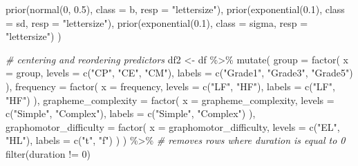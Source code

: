 \documentclass[
  11pt,
  english,
  ,doc,floatsintext]{apa6}
\newenvironment{Shaded}{}{}
\newcommand{\AttributeTok}[1]{\textcolor[rgb]{0.49,0.56,0.16}{#1}}
\newcommand{\CommentTok}[1]{\textcolor[rgb]{0.38,0.63,0.69}{\textit{#1}}}
\newcommand{\DecValTok}[1]{\textcolor[rgb]{0.25,0.63,0.44}{#1}}
\newcommand{\FloatTok}[1]{\textcolor[rgb]{0.25,0.63,0.44}{#1}}
\newcommand{\FunctionTok}[1]{\textcolor[rgb]{0.02,0.16,0.49}{#1}}
\newcommand{\NormalTok}[1]{#1}
\newcommand{\OtherTok}[1]{\textcolor[rgb]{0.00,0.44,0.13}{#1}}
\newcommand{\SpecialCharTok}[1]{\textcolor[rgb]{0.25,0.44,0.63}{#1}}
\newcommand{\StringTok}[1]{\textcolor[rgb]{0.25,0.44,0.63}{#1}}
\begin{document}
\begin{Shaded}
\begin{Highlighting}[]
    \FunctionTok{prior}\NormalTok{(}\FunctionTok{normal}\NormalTok{(}\DecValTok{0}\NormalTok{, }\FloatTok{0.5}\NormalTok{), }\AttributeTok{class =}\NormalTok{ b, }\AttributeTok{resp =} \StringTok{"lettersize"}\NormalTok{),}
    \FunctionTok{prior}\NormalTok{(}\FunctionTok{exponential}\NormalTok{(}\FloatTok{0.1}\NormalTok{), }\AttributeTok{class =}\NormalTok{ sd, }\AttributeTok{resp =} \StringTok{"lettersize"}\NormalTok{),}
    \FunctionTok{prior}\NormalTok{(}\FunctionTok{exponential}\NormalTok{(}\FloatTok{0.1}\NormalTok{), }\AttributeTok{class =}\NormalTok{ sigma, }\AttributeTok{resp =} \StringTok{"lettersize"}\NormalTok{)}
\NormalTok{    )}
\end{Highlighting}
\end{Shaded}

\begin{Shaded}
\begin{Highlighting}[]
\CommentTok{\# centering and reordering predictors}
\NormalTok{df2 }\OtherTok{\textless{}{-}}\NormalTok{ df }\SpecialCharTok{\%\textgreater{}\%}
    \FunctionTok{mutate}\NormalTok{(}
        \AttributeTok{group =} \FunctionTok{factor}\NormalTok{(}
            \AttributeTok{x =}\NormalTok{ group,}
            \AttributeTok{levels =} \FunctionTok{c}\NormalTok{(}\StringTok{"CP"}\NormalTok{, }\StringTok{"CE"}\NormalTok{, }\StringTok{"CM"}\NormalTok{),}
            \AttributeTok{labels =} \FunctionTok{c}\NormalTok{(}\StringTok{"Grade1"}\NormalTok{, }\StringTok{"Grade3"}\NormalTok{, }\StringTok{"Grade5"}\NormalTok{)}
\NormalTok{            ),}
        \AttributeTok{frequency =} \FunctionTok{factor}\NormalTok{(}
            \AttributeTok{x =}\NormalTok{ frequency,}
            \AttributeTok{levels =} \FunctionTok{c}\NormalTok{(}\StringTok{"LF"}\NormalTok{, }\StringTok{"HF"}\NormalTok{),}
            \AttributeTok{labels =} \FunctionTok{c}\NormalTok{(}\StringTok{"LF"}\NormalTok{, }\StringTok{"HF"}\NormalTok{)}
\NormalTok{            ),}
        \AttributeTok{grapheme\_complexity =} \FunctionTok{factor}\NormalTok{(}
            \AttributeTok{x =}\NormalTok{ grapheme\_complexity,}
            \AttributeTok{levels =} \FunctionTok{c}\NormalTok{(}\StringTok{"Simple"}\NormalTok{, }\StringTok{"Complex"}\NormalTok{),}
            \AttributeTok{labels =} \FunctionTok{c}\NormalTok{(}\StringTok{"Simple"}\NormalTok{, }\StringTok{"Complex"}\NormalTok{)}
\NormalTok{            ),}
        \AttributeTok{graphomotor\_difficulty =} \FunctionTok{factor}\NormalTok{(}
            \AttributeTok{x =}\NormalTok{ graphomotor\_difficulty,}
            \AttributeTok{levels =} \FunctionTok{c}\NormalTok{(}\StringTok{"EL"}\NormalTok{, }\StringTok{"HL"}\NormalTok{),}
            \AttributeTok{labels =} \FunctionTok{c}\NormalTok{(}\StringTok{"t"}\NormalTok{, }\StringTok{"f"}\NormalTok{)}
\NormalTok{            )}
\NormalTok{        ) }\SpecialCharTok{\%\textgreater{}\%}
    \CommentTok{\# removes rows where duration is equal to 0}
    \FunctionTok{filter}\NormalTok{(duration }\SpecialCharTok{!=} \DecValTok{0}\NormalTok{)}


\end{Highlighting}
\end{Shaded}
\end{document}
